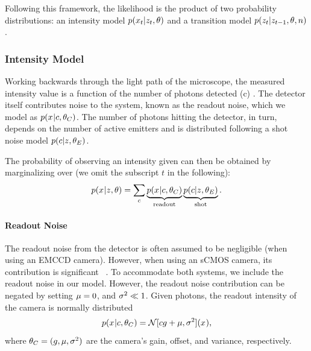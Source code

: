   Following this framework, the likelihood is the product of two probability
  distributions: an intensity model $p(x_{t}|z_{t},\theta)$ and a
  transition model $p(z_{t}|z_{t-1},\theta,n)$.

\subsubsection{Intensity Model}

Working backwards through the light path of the microscope, the measured intensity value \x{}
is a function of the number of photons \photons detected
(c)
\cite{pawely_three-dimensional,huang_video-rate_2013, laine_imaging_2021}.
  The detector itself contributes noise to the system, known as the readout
  noise, which we model as $p(x_{}|c,\theta_C)$.
  The number of photons hitting the detector, in turn, depends on the number of
  active emitters \z{} and is distributed following a shot noise model
  $p(c|z_{},\theta_E)$.

The probability of observing an intensity \x{} given \z{} can then be obtained
by marginalizing over \photons (we omit the subscript $t$ in the following):
  \begin{equation}
    p(x_{}|z_{},\theta) =
      \sum_c
        \underbrace{p(x_{}|c,\theta_C)}_{\text{readout}}
        \underbrace{p(c|z_{},\theta_E)}_{\text{shot}}
    \text{.}
    \label{eq:method:marginalized_intensity}
  \end{equation}

\paragraph{Readout Noise}

The readout noise from the detector is often assumed to be negligible (\ie when
using an EMCCD camera).
  However, when using an sCMOS camera, its contribution is 
  significant ~\citep{huang_video-rate_2013}.
  To accommodate both systems, we include the readout noise in our model.
  However, the readout noise contribution can be negated by setting $\mu=0$, 
  and $\sigma^2 \ll 1$.
  Given \photons photons, the readout intensity of the camera is normally
  distributed~\citep{huang_video-rate_2013}
  \begin{equation}
    p(x_{}|c,\theta_C) = \mathcal{N}[cg + \mu, \sigma^2](x_{})
    \text{,}
  \end{equation}
  where $\theta_C = (g, \mu, \sigma^2)$ are the camera's gain,
  offset, and variance, respectively.

